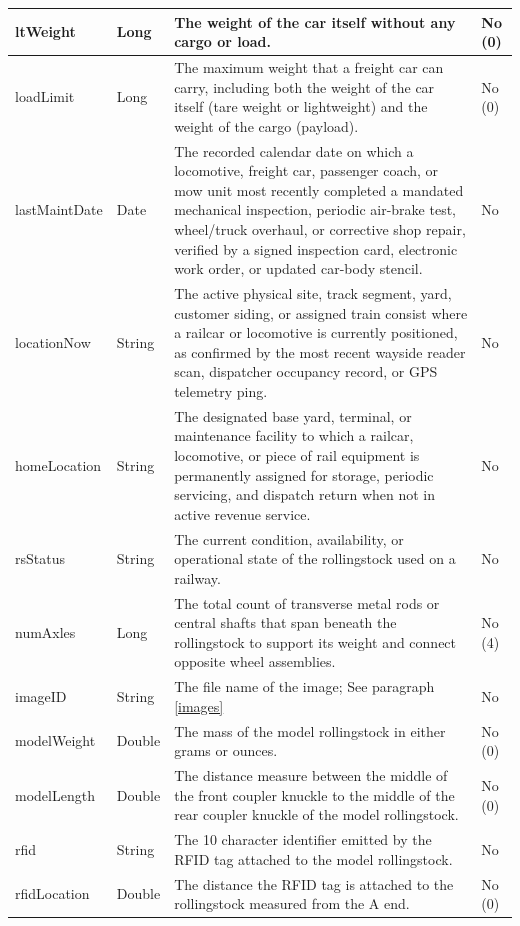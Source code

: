 \begin{longtable}{|L{3cm}|L{1.7cm}|L{9.1cm}|L{1.0cm}|}
	ltWeight & Long & The weight of the car itself without any cargo or load. & No (0)\\ \hline
	loadLimit & Long & The maximum weight that a freight car can carry, including both the weight of the car itself (tare weight or lightweight) and the weight of the cargo (payload). & No (0)\\ \hline
	lastMaintDate & Date & The recorded calendar date on which a locomotive, freight car, passenger coach, or \gls{mow} unit most recently completed a mandated mechanical inspection, periodic air-brake test, wheel/truck overhaul, or corrective shop repair, verified by a signed inspection card, electronic work order, or updated car-body stencil. & No \\ \hline
	locationNow & String & The active physical site, track segment, yard, customer siding, or assigned train consist where a railcar or locomotive is currently positioned, as confirmed by the most recent wayside reader scan, dispatcher occupancy record, or GPS telemetry ping. & No \\ \hline
	homeLocation & String & The designated base yard, terminal, or maintenance facility to which a railcar, locomotive, or piece of rail equipment is permanently assigned for storage, periodic servicing, and dispatch return when not in active revenue service. & No \\ \hline
	rsStatus & String & The current condition, availability, or operational state of the rollingstock used on a railway. & No \\ \hline
    numAxles & Long &  The total count of transverse metal rods or central shafts that span beneath the rollingstock to support its weight and connect opposite wheel assemblies. & No (4)\\ \hline
	imageID & String &  The file name of the image; See paragraph \ref{images} & No \\ \hline
	modelWeight & Double & The mass of the model rollingstock in either grams or ounces. & No (0)\\ \hline
	modelLength & Double & The distance measure between the middle of the front coupler knuckle to the middle of the rear coupler knuckle of the model rollingstock. & No (0)\\ \hline
	rfid & String & The 10 character identifier emitted by the RFID tag attached to the model rollingstock. & No \\ \hline
    rfidLocation & Double & The distance the RFID tag is attached to the rollingstock measured from the A end. & No (0)\\ \hline
    \end{longtable}
